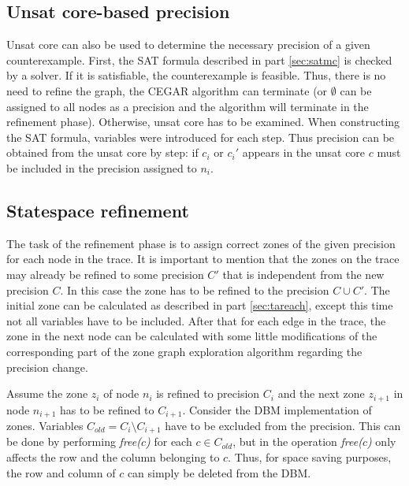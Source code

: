 
\subsection{Unsat core-based precision}

Unsat core can also be used to determine the necessary precision of a given counterexample. First, the SAT formula described in part \ref{sec:satmc} is checked by a solver. If it is satisfiable, the counterexample is feasible. Thus, there is no need to refine the graph, the CEGAR algorithm can terminate (or $\emptyset$ can be assigned to all nodes as a precision and the algorithm will terminate in the refinement phase). Otherwise, unsat core has to be examined. When constructing the SAT formula, variables were introduced for each step. Thus precision can be obtained from the unsat core by step: if $c_i$ or $c_i'$ appears in the unsat core $c$ must be included in the precision assigned to $n_i$.


\subsection{Statespace refinement}

The task of the refinement phase is to assign correct zones of the given precision for each node in the trace. It is important to mention that the zones on the trace may already be refined to some precision $C'$ that is independent from the new precision $C$. In this case the zone has to be refined to the precision $C \cup C'$.  The initial zone can be calculated as described in part \ref{sec:tareach}, except this time not all variables have to be included.  After that for each edge in the trace, the zone in the next node can be calculated with some little modifications of the corresponding part of the zone graph exploration algorithm regarding the precision change.

Assume the zone $z_i$ of node $n_i$ is refined to precision $C_i$ and the next zone $z_{i+1}$ in node $n_{i+1}$ has to be refined to $C_{i+1}$. Consider the DBM implementation of zones. Variables $C_{old}=C_{i} \setminus C_{i+1}$ have to be excluded from the precision. This can be done by performing \emph{free($c$)} for each $c \in C_{old}$, but in \cite{bengtsson2004timed} the operation \emph{free($c$)} only affects the row and the column belonging to $c$. Thus, for space saving purposes, the row and column of $c$ can simply be deleted from the DBM. 

